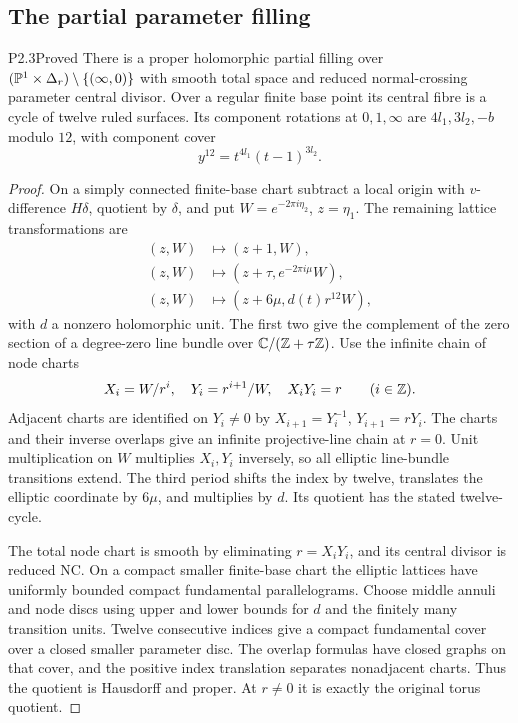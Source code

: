 \subsection{The partial parameter filling}
\begin{statement}{P2.3}{Proved}
There is a proper holomorphic partial filling over $(\mathbb P^1\times\Delta_r)\setminus\{(\infty,0)\}$ with smooth total space and reduced normal-crossing parameter central divisor. Over a regular finite base point its central fibre is a cycle of twelve ruled surfaces. Its component rotations at $0,1,\infty$ are $4l_1,3l_2,-b$ modulo $12$, with component cover
\[
 y^{12}=t^{4l_1}(t-1)^{3l_2}.
\]
\end{statement}
\begin{proof}
On a simply connected finite-base chart subtract a local origin with $v$-difference $H\delta$, quotient by $\delta$, and put $W=e^{-2\pi i\eta_2}$, $z=\eta_1$. The remaining lattice transformations are
\begin{align*}
 (z,W)&\mapsto(z+1,W),\\
 (z,W)&\mapsto(z+\tau,e^{-2\pi i\mu}W),\\
 (z,W)&\mapsto(z+6\mu,d(t)r^{12}W),
\end{align*}
with $d$ a nonzero holomorphic unit. The first two give the complement of the zero section of a degree-zero line bundle over $\mathbb C/(\mathbb Z+\tau\mathbb Z)$. Use the infinite chain of node charts
\begin{equation}\label{eq:P2chain}
 X_i=W/r^i,\quad Y_i=r^{i+1}/W,\quad X_iY_i=r\qquad(i\in\mathbb Z).
\end{equation}
Adjacent charts are identified on $Y_i\ne0$ by $X_{i+1}=Y_i^{-1}$, $Y_{i+1}=rY_i$. The charts and their inverse overlaps give an infinite projective-line chain at $r=0$. Unit multiplication on $W$ multiplies $X_i,Y_i$ inversely, so all elliptic line-bundle transitions extend. The third period shifts the index by twelve, translates the elliptic coordinate by $6\mu$, and multiplies by $d$. Its quotient has the stated twelve-cycle.

The total node chart is smooth by eliminating $r=X_iY_i$, and its central divisor is reduced NC. On a compact smaller finite-base chart the elliptic lattices have uniformly bounded compact fundamental parallelograms. Choose middle annuli and node discs using upper and lower bounds for $d$ and the finitely many transition units. Twelve consecutive indices give a compact fundamental cover over a closed smaller parameter disc. The overlap formulas have closed graphs on that cover, and the positive index translation separates nonadjacent charts. Thus the quotient is Hausdorff and proper. At $r\ne0$ it is exactly the original torus quotient.


\end{proof}
